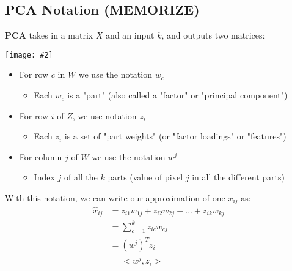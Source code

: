 \documentclass{article}
\def\blu#1{{\color{blu}#1}}
\def\gre#1{{\color{gre}#1}}
\def\red#1{{\color{red}#1}}
\newcommand{\centerfig}[2]{\begin{center}\texttt{[image: \#2]}\end{center}}
\begin{document}
\subsection*{PCA Notation (MEMORIZE)}
\blu{\textbf{PCA}} takes in a matrix $ X $ and an input $ k $, and outputs two matrices:
\centerfig{0.8}{PCA-2}
\begin{itemize}
	\item For \gre{row $ c $ in $ W $ we use the notation $ w_c $}
	\begin{itemize}
		\item Each $ w_c $ is a "part" (also called a "\blu{factor}" or "\blu{principal component}")
	\end{itemize}
	\item For \gre{row $ i $ of $ Z$, we use notation $ z_i $}
	\begin{itemize}
		\item Each $ z_i $ is a set of "part weights" (or "factor loadings" or "features")
	\end{itemize}
\item For \red{column $ j $ of $ W $ we use the notation $ w^j $}
\begin{itemize}
	\item Index $ j $ of all the $ k $ parts (value of pixel $ j $ in all the different parts)
\end{itemize}
\end{itemize}
With this notation, we can write our approximation of one $ x_{ij} $ as:
\begin{align*}
\hat{x}_{ij} &= z_{i1} w_{1j} + z_{i2} w_{2j} + \dots + z_{ik} w_{kj} \\
&= \sum_{c = 1}^{k} z_{ic} w_{cj} \\
&= (w^j)^Tz_i \\ &= <w^j, z_i>
\end{align*}
\end{document}
